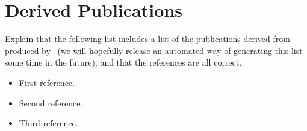 \chapter{Derived Publications}
\label{app:derived_publications}

Explain that the following list includes a list of the publications derived from
produced by \BIBTeX\ (we will hopefully release an automated way of generating
this list some time in the future), and that the references are all correct.

\begin{itemize}
    \item First reference.

    \item Second reference.

    \item Third reference.
\end{itemize}

